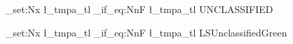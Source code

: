 \documentclass[letterpaper]{article}
\begin{document}
\ExplSyntaxOn
\tl_set:Nx \l_tmpa_tl {\LSBannerText}
\tl_if_eq:NnF \l_tmpa_tl {UNCLASSIFIED}
  {\PackageError{linearspace-test}{UNCLASSIFIED~banner~regression}{}}
\tl_set:Nx \l_tmpa_tl {\LSBannerColor}
\tl_if_eq:NnF \l_tmpa_tl {LSUnclassifiedGreen}
  {\PackageError{linearspace-test}{UNCLASSIFIED~banner-color~regression}{}}
\ExplSyntaxOff
{}
\end{document}
